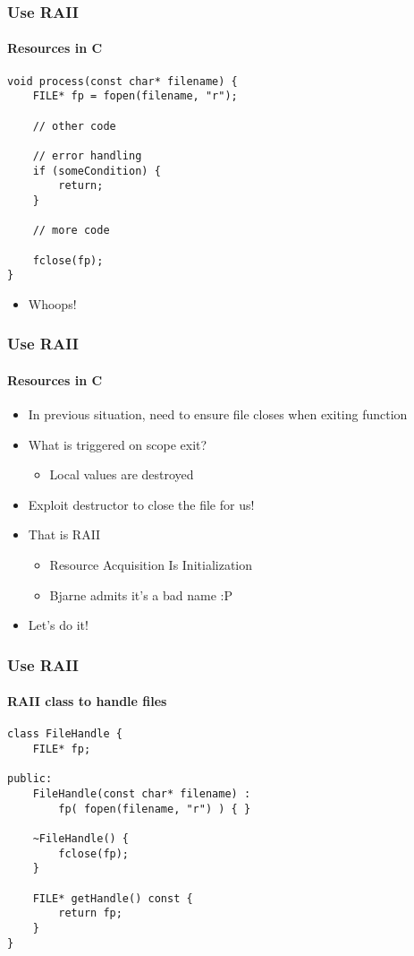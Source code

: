 \begin{frame}[fragile]
    \frametitle{\declarerule Use RAII}
    \framesubtitle{Resources in C}
    \begin{lstlisting}[title=Forgetting to close]
void process(const char* filename) {
    FILE* fp = fopen(filename, "r");

    // other code

    // error handling
    if (someCondition) {
        return;
    }

    // more code

    fclose(fp);
}
    \end{lstlisting}
    \begin{itemize}
        \item Whoops!
    \end{itemize}
\end{frame}

\begin{frame}
    \frametitle{\declarerule Use RAII}
    \framesubtitle{Resources in C}
    \begin{itemize}
        \item In previous situation, need to ensure file closes when exiting function
        \item What is triggered on scope exit?
            \begin{itemize}
                \item Local values are destroyed
            \end{itemize}
        \item Exploit destructor to close the file for us!
        \item That is RAII
            \begin{itemize}
                \item Resource Acquisition Is Initialization
                \item Bjarne admits it's a bad name :P
            \end{itemize}
        \item Let's do it!
    \end{itemize}
\end{frame}

\begin{frame}[fragile]
    \frametitle{\declarerule Use RAII}
    \framesubtitle{RAII class to handle files}
    \begin{lstlisting}[title=Problems begone!]
class FileHandle {
    FILE* fp;

public:
    FileHandle(const char* filename) :
        fp( fopen(filename, "r") ) { }

    ~FileHandle() {
        fclose(fp);
    }

    FILE* getHandle() const {
        return fp;
    }
}
    \end{lstlisting}
\end{frame}

